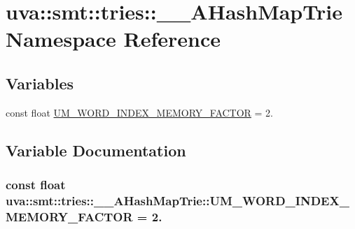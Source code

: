 \hypertarget{namespaceuva_1_1smt_1_1tries_1_1_____a_hash_map_trie}{}\section{uva\+:\+:smt\+:\+:tries\+:\+:\+\_\+\+\_\+\+A\+Hash\+Map\+Trie Namespace Reference}
\label{namespaceuva_1_1smt_1_1tries_1_1_____a_hash_map_trie}
\subsection*{Variables}
\begin{DoxyCompactItemize}
\item 
const float \hyperlink{namespaceuva_1_1smt_1_1tries_1_1_____a_hash_map_trie_ad8c7f2e55f1aa93739f8404784918d9a}{U\+M\+\_\+\+W\+O\+R\+D\+\_\+\+I\+N\+D\+E\+X\+\_\+\+M\+E\+M\+O\+R\+Y\+\_\+\+F\+A\+C\+T\+O\+R} = 2.
\end{DoxyCompactItemize}


\subsection{Variable Documentation}
\hypertarget{namespaceuva_1_1smt_1_1tries_1_1_____a_hash_map_trie_ad8c7f2e55f1aa93739f8404784918d9a}{}
\subsubsection[{U\+M\+\_\+\+W\+O\+R\+D\+\_\+\+I\+N\+D\+E\+X\+\_\+\+M\+E\+M\+O\+R\+Y\+\_\+\+F\+A\+C\+T\+O\+R}]{\setlength{\rightskip}{0pt plus 5cm}const float uva\+::smt\+::tries\+::\+\_\+\+\_\+\+A\+Hash\+Map\+Trie\+::\+U\+M\+\_\+\+W\+O\+R\+D\+\_\+\+I\+N\+D\+E\+X\+\_\+\+M\+E\+M\+O\+R\+Y\+\_\+\+F\+A\+C\+T\+O\+R = 2.}\label{namespaceuva_1_1smt_1_1tries_1_1_____a_hash_map_trie_ad8c7f2e55f1aa93739f8404784918d9a}
